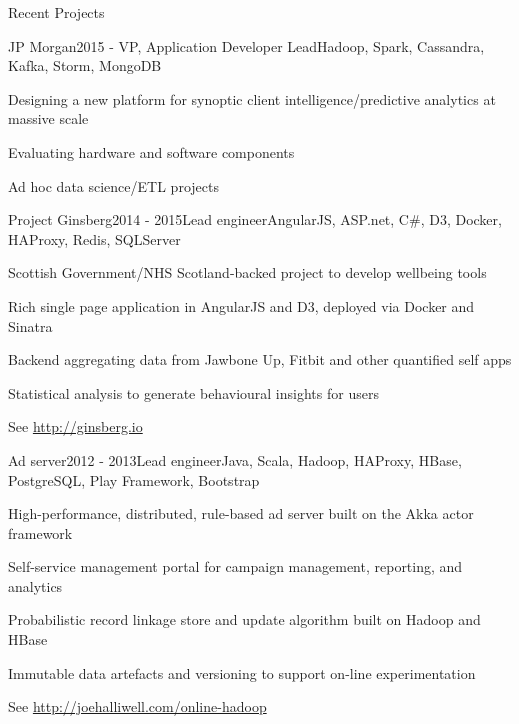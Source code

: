 \documentclass{resume} %
\begin{document}
\begin{rSection}{Recent Projects}

\begin{rSubsection}{JP Morgan}{2015 - }{VP, Application Developer Lead}{Hadoop, Spark, Cassandra, Kafka, Storm, MongoDB}
\item Designing a new platform for synoptic client intelligence/predictive analytics at massive scale
\item Evaluating hardware and software components
\item Ad hoc data science/ETL projects
\end{rSubsection}

\begin{rSubsection}{Project Ginsberg}{2014 - 2015}{Lead engineer}{AngularJS, ASP.net, C\#, D3, Docker, HAProxy, Redis, SQLServer}
\item Scottish Government/NHS Scotland-backed project to develop wellbeing tools
\item Rich single page application in AngularJS and D3, deployed via Docker and Sinatra
\item Backend aggregating data from Jawbone Up, Fitbit and other quantified self apps
\item Statistical analysis to generate behavioural insights for users
\item See \url{http://ginsberg.io}
\end{rSubsection}


\begin{rSubsection}{Ad server}{2012 - 2013}{Lead engineer}{Java, Scala, Hadoop, HAProxy, HBase, PostgreSQL, Play Framework, Bootstrap}
\item High-performance, distributed, rule-based ad server built on the Akka actor framework
\item Self-service management portal for campaign management, reporting, and analytics
\item Probabilistic record linkage store and update algorithm built on Hadoop and HBase
\item Immutable data artefacts and versioning to support on-line experimentation
\item See \url{http://joehalliwell.com/online-hadoop}
\end{rSubsection}


\end{rSection}
\end{document}
